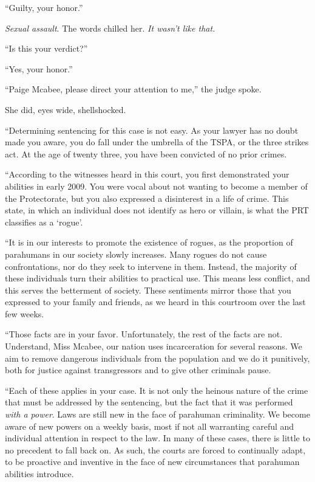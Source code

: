``Guilty, your honor.''



\emph{Sexual assault}.  The words chilled her.  \emph{It wasn't like that.}



``Is this your verdict?''



``Yes, your honor.''



``Paige Mcabee, please direct your attention  to me,'' the judge spoke.



She did, eyes wide, shellshocked.



``Determining sentencing for this case is not easy.  As your lawyer has no doubt made you aware, you do fall under the umbrella of the TSPA, or the three strikes act.  At the age of twenty three, you have been convicted of no prior crimes.



``According to the witnesses heard in this court, you first demonstrated your abilities in early 2009.  You were vocal about not wanting to become a member of the Protectorate, but you also expressed a disinterest in a life of crime.  This state, in which an individual does not identify as hero or villain, is what the PRT classifies as a `rogue'.



``It is in our interests to promote the existence of rogues, as the proportion of parahumans in our society slowly increases.  Many rogues do not cause confrontations, nor do they seek to intervene in them.  Instead, the majority of these individuals turn their abilities to practical use.  This means less conflict, and this serves the betterment of society.  These sentiments mirror those that you expressed to your family and friends, as we heard in this courtroom over the last few weeks.



``Those facts are in your favor.  Unfortunately, the rest of the facts are not.  Understand, Miss Mcabee, our nation uses incarceration for several reasons.  We aim to remove dangerous individuals from the population and we do it punitively, both for justice against transgressors and to give other criminals pause.



``Each of these applies in your case.  It is not only the heinous nature of the crime that must be addressed by the sentencing, but the fact that it was performed \emph{with a power}.  Laws are still new in the face of parahuman criminality.  We become aware of new powers on a weekly basis, most if not all warranting careful and individual attention in respect to the law.  In many of these cases, there is little to no precedent to fall back on.  As such, the courts are forced to continually adapt, to be proactive and inventive in the face of new circumstances that parahuman abilities introduce.



